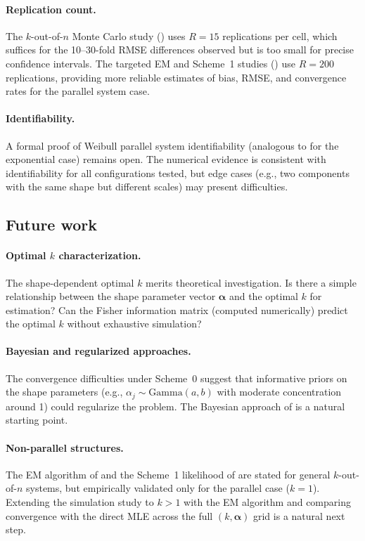 \documentclass[12pt]{article}
\theoremstyle{definition}
\theoremstyle{remark}
\newcommand{\balpha}{\boldsymbol{\alpha}}
\begin{document}
\paragraph{Replication count.}
The $k$-out-of-$n$ Monte Carlo study ()
uses $R = 15$ replications per cell, which suffices for the
10--30-fold RMSE differences observed but is too small for precise
confidence intervals.  The targeted EM and Scheme~1 studies
() use $R = 200$
replications, providing more reliable estimates of bias, RMSE,
and convergence rates for the parallel system case.

\paragraph{Identifiability.}
A formal proof of Weibull parallel system identifiability
(analogous to \citealt{BasuGhosh1980} for the exponential case)
remains open.  The numerical evidence is consistent with
identifiability for all configurations tested, but edge cases
(e.g., two components with the same shape but different scales)
may present difficulties.

\subsection{Future work}

\paragraph{Optimal $k$ characterization.}
The shape-dependent optimal $k$ merits theoretical investigation.
Is there a simple relationship between the shape parameter vector
$\balpha$ and the optimal $k$ for estimation?  Can the Fisher
information matrix (computed numerically) predict the optimal $k$
without exhaustive simulation?

\paragraph{Bayesian and regularized approaches.}
The convergence difficulties under Scheme~0 suggest that informative
priors on the shape parameters (e.g.,
$\alpha_j \sim \mathrm{Gamma}(a, b)$ with moderate concentration
around 1) could regularize the problem.  The Bayesian approach of
\citet{BheringPereiraPolpo2014} is a natural starting point.

\paragraph{Non-parallel structures.}
The EM algorithm of  and the Scheme~1
likelihood of  are stated for general
$k$-out-of-$n$ systems, but empirically validated only for the
parallel case ($k = 1$).  Extending the simulation study to
$k > 1$ with the EM algorithm and comparing convergence with
the direct MLE across the full $(k, \balpha)$ grid is a natural
next step.
\end{document}
